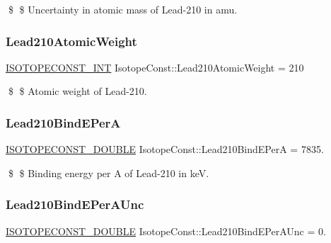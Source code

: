 \$ \$ Uncertainty in atomic mass of Lead-\/210 in amu. \mbox{\label{group___isotope_const-_lead-_pb210_ga6d7f130937c109f62f637f9352b52a7a}} 
\subsubsection{\texorpdfstring{Lead210\+Atomic\+Weight}{Lead210AtomicWeight}}
{\footnotesize\ttfamily \mbox{\hyperlink{group___isotope_const-_macros_ga5f18360b3e99483a35c32d789e62621c}{I\+S\+O\+T\+O\+P\+E\+C\+O\+N\+S\+T\+\_\+\+I\+NT}} Isotope\+Const\+::\+Lead210\+Atomic\+Weight = 210}

\$ \$ Atomic weight of Lead-\/210. \mbox{\label{group___isotope_const-_lead-_pb210_ga1b04c26eb15b7b1a0da89495e77542c5}} 
\subsubsection{\texorpdfstring{Lead210\+Bind\+E\+PerA}{Lead210BindEPerA}}
{\footnotesize\ttfamily \mbox{\hyperlink{group___isotope_const-_macros_ga8f45a7272ce02c0b4c65c44636ed719a}{I\+S\+O\+T\+O\+P\+E\+C\+O\+N\+S\+T\+\_\+\+D\+O\+U\+B\+LE}} Isotope\+Const\+::\+Lead210\+Bind\+E\+PerA = 7835.}

\$ \$ Binding energy per A of Lead-\/210 in keV. \mbox{\label{group___isotope_const-_lead-_pb210_ga7ebc7217036dccbfc50b781d4f84b41e}} 
\subsubsection{\texorpdfstring{Lead210\+Bind\+E\+Per\+A\+Unc}{Lead210BindEPerAUnc}}
{\footnotesize\ttfamily \mbox{\hyperlink{group___isotope_const-_macros_ga8f45a7272ce02c0b4c65c44636ed719a}{I\+S\+O\+T\+O\+P\+E\+C\+O\+N\+S\+T\+\_\+\+D\+O\+U\+B\+LE}} Isotope\+Const\+::\+Lead210\+Bind\+E\+Per\+A\+Unc = 0.}


